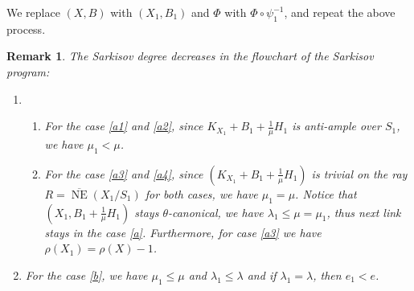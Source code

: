\documentclass[11pt]{amsart}
\newtheorem{rmk}[defn]{Remark}
\begin{document}
We replace $(X,B)$ with $(X_1,B_1)$ and $\Phi$ with $\Phi\circ\psi_1^{-1}$, and repeat the above process. 
\begin{rmk} \label{R-Sarkisovdeg}
  The Sarkisov degree decreases in the flowchart of the Sarkisov program:
  \begin{enumerate}
    \item
          \begin{enumerate}
            \item For the case \ref{a1} and \ref{a2},  since $ K_{X_1}+B_1+\frac{1}{\mu}H_1 $ is anti-ample over $S_1$, we have    $\mu_1<\mu$.
            \item For the case \ref{a3} and \ref{a4}, since $ (K_{X_1}+B_1+\frac{1}{\mu}H_1) $ is trivial on the ray $ R=\overline{\operatorname{NE}}(X_1/S_1) $ for both cases, we have $\mu_1=\mu$.
                  Notice that $ (X_1,B_1+\frac{1}{\mu}H_1) $ stays $ \theta $-canonical, we have $\lambda_1\leqslant \mu=\mu_1$, thus next link stays in the case \ref{a}. Furthermore,   for case \ref{a3} we have $\rho(X_1)=\rho(X)-1$.
          \end{enumerate}
    \item For the case \ref{b}, we have  $\mu_1\leqslant \mu$ and $\lambda_1\leqslant \lambda$ and if $ \lambda_1=\lambda $, then   $e_1<e$.
  \end{enumerate}
\end{rmk}
\end{document}
